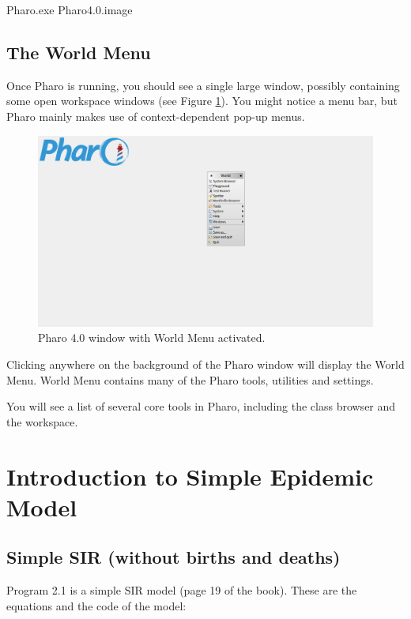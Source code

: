 \documentclass[a4paper,10pt,twoside]{book}
\begin{document}
\begin{code}{}
Pharo.exe Pharo4.0.image
\end{code}

\section{The World Menu}\label{The World Menu}
Once Pharo is running, you should see a single large window, possibly containing
some open workspace windows (see Figure \ref{worldMenu}). You might notice a menu
bar, but Pharo mainly makes use of context-dependent pop-up menus.


\begin{figure}

\begin{center}
\includegraphics[width=1.0\textwidth]{figures/Pharo40.png}\caption{Pharo 4.0 window with World Menu activated.\label{worldMenu}}\end{center}
\end{figure}


Clicking anywhere on the background of the Pharo window will display the
World Menu. World Menu contains many of the Pharo tools, utilities and settings.

You will see a list of several core tools in Pharo, including the class browser
and the workspace.
\chapter{ Introduction to Simple Epidemic Model}\label{ Introduction to Simple Epidemic Model}\section{ Simple SIR (without births and deaths)}\label{ Simple SIR (without births and deaths)}
Program 2.1 is a simple SIR model (page 19 of the book). These are the equations and the code of the model:
\end{document}
